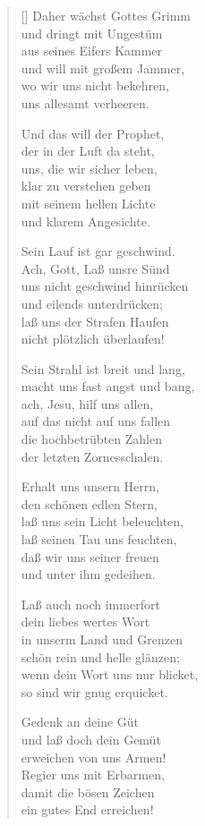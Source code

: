 \begin{multicols}{2}
\begin{verse}[\versewidth]
 Daher wächst Gottes Grimm\\
und dringt mit Ungestüm\\
aus seines Eifers Kammer\\
und will mit großem Jammer,\\
wo wir uns nicht bekehren,\\
uns allesamt verheeren.

 Und das will der Prophet,\\
der in der Luft da steht,\\
uns, die wir sicher leben,\\
klar zu verstehen geben\\
mit seinem hellen Lichte\\
und klarem Angesichte.

 Sein Lauf ist gar geschwind.\\
Ach, Gott, Laß unsre Sünd\\
uns nicht geschwind hinrücken\\
und eilends unterdrücken;\\
laß uns der Strafen Haufen\\
nicht plötzlich überlaufen!

 Sein Strahl ist breit und lang,\\
macht uns fast angst und bang,\\
ach, Jesu, hilf uns allen,\\
auf das nicht auf uns fallen\\
die hochbetrübten Zahlen\\
der letzten Zornesschalen.

 Erhalt uns unsern Herrn,\\
den schönen edlen Stern,\\
laß uns sein Licht beleuchten,\\
laß seinen Tau uns feuchten,\\
daß wir uns seiner freuen\\
und unter ihm gedeihen.

 Laß auch noch immerfort\\
dein liebes wertes Wort\\
in unserm Land und Grenzen\\
schön rein und helle glänzen;\\
wenn dein Wort uns nur blicket,\\
so sind wir gnug erquicket.

 Gedenk an deine Güt\\
und laß doch dein Gemüt\\
erweichen von uns Armen!\\
Regier uns mit Erbarmen,\\
damit die bösen Zeichen\\
ein gutes End erreichen!

\end{verse}
\end{multicols}
